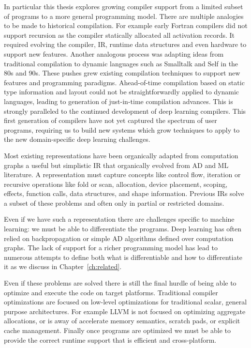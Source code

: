 In particular this thesis explores growing compiler support from
  a limited subset of programs to a more general programming model.
There are multiple analogies to be made to historical compilation.
For example early Fortran compilers did not support recursion
  as the compiler statically allocated all activation records\cite{fortran_recursion}.
It required evolving the compiler, IR, runtime data structures and even hardware
  to support new features.
Another analogous process was adapting ideas from traditional compilation
  to dynamic languages such as Smalltalk and Self in the 80s and 90s.
These pushes grew existing compilation techniques to support new features
  and programming paradigms.
Ahead-of-time compilation based on static type information and layout
  could not be straightforwardly applied to dynamic languages, leading
  to generation of just-in-time compilation advances.
This is strongly paralleled to the continued
  development of deep learning compilers.
This first generation of compilers have not yet
  captured the spectrum of user programs, requiring us to build
  new systems which grow techniques to apply to the new
  domain-specific deep learning challenges.

Most existing representations have been organically adapted from
  computation graphs a useful but simplistic IR that organically
  evolved from AD and ML literature.
A representation must capture concepts like control flow, iteration
  or recursive operations like fold or scan, allocation,
  device placement, scoping, effects, function calls, data structures,
  and shape information.
Previous IRs solve a subset of these problems and often only in partial
  or restricted domains.

Even if we have such a representation there are challenges specific to
 machine learning: we must be able to differentiate the programs.
Deep learning has often relied on backpropagation or simple AD algorithms
  defined over computation graphs.
The lack of support for a richer programming model has lead to numerous
  attempts to define both what is differentiable and how to differentiate
  it as we discuss in Chapter~\ref{ch:related}.

Even if these problems are solved there is still the final hurdle of being
  able to optimize and execute the code on target platforms.
Traditional compiler optimizations are focused on low-level optimizations
  for traditional scalar, general purpose architectures.
For example LLVM is not focused on optimizing aggregate allocations,
  or is away of accelerate memory semantics, scratch pads, or explicit
  cache management.
Finally once programs are optimized we must be able to
  provide the correct runtime support that is efficient and cross-platform.

